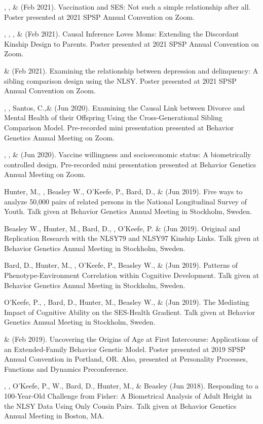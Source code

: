 \begin{etaremune}
%
\item \jt, \kl, \& \meb (Feb 2021). Vaccination and SES: Not such a simple relationship after all. Poster presented at 2021 SPSP Annual Convention on Zoom.
%
\item \meb, \emsims, \jt, \& \kl  (Feb 2021). Causal Inference Loves Moms: Extending the Discordant Kinship Design to Parents. Poster presented at 2021 SPSP Annual Convention on Zoom.
%
\item \emsims\hspace* {2 pt} \& \meb (Feb 2021). Examining the relationship between depression and delinquency: A sibling comparison design using the NLSY. Poster presented at 2021 SPSP Annual Convention on Zoom.
%
\item \kl, \jt, Santos, C.,\noteB \& \meb (Jun 2020). Examining the Causal Link between Divorce and Mental Health of their Offspring Using the Cross-Generational Sibling Comparison Model. Pre-recorded mini presentation presented at Behavior Genetics Annual Meeting on Zoom.
%
\item \jt, \kl, \& \meb (Jun 2020). Vaccine willingness and socioeconomic status: A biometrically controlled design. Pre-recorded mini presentation presented at Behavior Genetics Annual Meeting on Zoom.
%
\item Hunter, M., \meb, Beasley W., O'Keefe, P.,  Bard, D., \& \Joe (Jun 2019). Five ways to analyze 50,000 pairs of related persons in the National Longitudinal Survey of Youth. Talk given at Behavior Genetics Annual Meeting in Stockholm, Sweden. 

\item Beasley W., Hunter, M., Bard, D., \meb, O'Keefe, P. \&  \Joe (Jun 2019). Original and Replication Research with the NLSY79 and NLSY97 Kinship Links. Talk given at Behavior Genetics Annual Meeting in Stockholm, Sweden. 
%
\item Bard, D., Hunter, M., \meb, O'Keefe, P., Beasley W.,  \&  \Joe (Jun 2019). Patterns of Phenotype-Environment Correlation within Cognitive Development. Talk given at Behavior Genetics Annual Meeting in Stockholm, Sweden. 

\item O'Keefe, P., \meb, Bard, D., Hunter, M.,  Beasley W.,  \&  \Joe (Jun 2019). The Mediating Impact of Cognitive Ability on the SES-Health Gradient. Talk given at Behavior Genetics Annual Meeting in Stockholm, Sweden. 
%
\item \meb \& \Joe (Feb 2019). Uncovering the Origins of Age at First Intercourse: Applications of an Extended-Family Behavior Genetic Model. Poster presented at 2019 SPSP Annual Convention in Portland, OR. Also, presented at Personality Processes, Functions and Dynamics Preconference.
%
\item\Joe, \meb, O'Keefe, P., W., Bard, D., Hunter, M., \& Beasley (Jun 2018). Responding to a 100-Year-Old Challenge from Fisher: A Biometrical Analysis of Adult Height in the NLSY Data Using Only Cousin Pairs. Talk given at Behavior Genetics Annual Meeting in Boston, MA. 


\end{etaremune}
